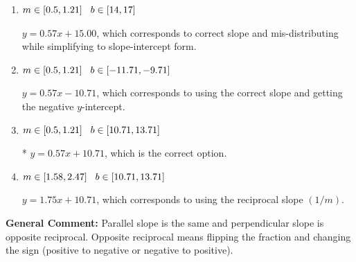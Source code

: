 \documentclass{extbook}[14pt]
\begin{document}
\begin{enumerate}
{\begin{enumerate}[label=\Alph*.]
 $y = -0.57x - 0.71$, which corresponds to using the negative slope.
\item \( m \in [0.5, 1.21] \hspace*{3mm} b \in [14, 17] \)

 $y = 0.57x + 15.00$, which corresponds to correct slope and mis-distributing while simplifying to slope-intercept form.
\item \( m \in [0.5, 1.21] \hspace*{3mm} b \in [-11.71, -9.71] \)

 $y = 0.57x - 10.71$, which corresponds to using the correct slope and getting the negative $y$-intercept.
\item \( m \in [0.5, 1.21] \hspace*{3mm} b \in [10.71, 13.71] \)

* $y = 0.57x + 10.71$, which is the correct option.
\item \( m \in [1.58, 2.47] \hspace*{3mm} b \in [10.71, 13.71] \)

 $y = 1.75x + 10.71$, which corresponds to using the reciprocal slope $(1/m)$.
\end{enumerate}

\textbf{General Comment:} Parallel slope is the same and perpendicular slope is opposite reciprocal. Opposite reciprocal means flipping the fraction and changing the sign (positive to negative or negative to positive).
}
\end{enumerate}
\end{document}
